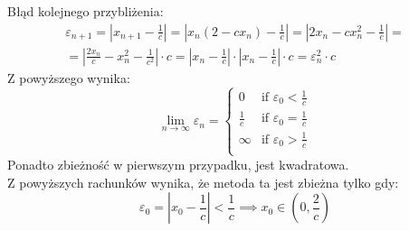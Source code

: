 \documentclass{article}
\title{}
\date{27.10.2020}
\begin{document}
Błąd kolejnego przybliżenia:
\begin{multline*}
\varepsilon_{n+1} = \left| x_{n+1} - \frac{1}{c} \right| = \left |x_n(2-cx_n) - \frac{1}{c} \right| = \left |2x_n-cx_n^2 - \frac{1}{c} \right| = \\ =  \left |\frac{2x_n}{c}-x_n^2 - \frac{1}{c^2} \right| \cdot c = \left | x_n - \frac{1}{c} \right | \cdot \left | x_n - \frac{1}{c} \right | \cdot c = \varepsilon_{n}^2\cdot c
\end{multline*}
Z powyższego wynika:
$$
\lim_{n \to \infty} \varepsilon_n  =
\left\{
    \begin{array}{ll}
        0 & \mbox{if } \varepsilon_0 < \frac{1}{c} \\
        \frac{1}{c} & \mbox{if } \varepsilon_0 = \frac{1}{c} \\
        \infty & \mbox{if } \varepsilon_0 > \frac{1}{c} \\
    \end{array}
\right.
$$
Ponadto zbieżność w pierwszym przypadku, jest kwadratowa.\\
Z powyższych rachunków wynika, że metoda ta jest zbieżna tylko gdy:
$$\varepsilon_0 = \left| x_{0} - \frac{1}{c} \right| < \frac{1}{c} \implies x_0 \in \left(0,\frac{2}{c}\right)$$
\end{document}
